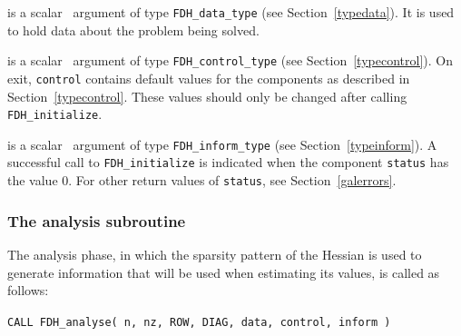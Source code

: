 \documentclass{galahad}
\newcommand{\packagename}{FDH}
\begin{document}
\vspace*{-3mm}
\begin{description}

 is a scalar \intentinout\ argument of type 
{\tt \packagename\_data\_type}
(see Section~\ref{typedata}). It is used to hold data about the problem being 
solved. 

 is a scalar \intentout\ argument of type 
{\tt \packagename\_control\_type}
(see Section~\ref{typecontrol}). 
On exit, {\tt control} contains default values for the components as
described in Section~\ref{typecontrol}.
These values should only be changed after calling 
{\tt \packagename\_initialize}.

 is a scalar \intentout\ argument of type 
{\tt \packagename\_inform\_type}
(see Section~\ref{typeinform}). A successful call to
{\tt \packagename\_initialize}
is indicated when the  component {\tt status} has the value 0. 
For other return values of {\tt status}, see Section~\ref{galerrors}.

\end{description}


\subsubsection{The analysis subroutine}
The analysis phase, in which the sparsity pattern of the Hessian
is used to generate information that will be used when estimating 
its values, is called as follows:

\vspace*{1mm}

\hspace{8mm}
{\tt CALL \packagename\_analyse( n, nz, ROW, DIAG, data, control, inform )}
\end{document}
